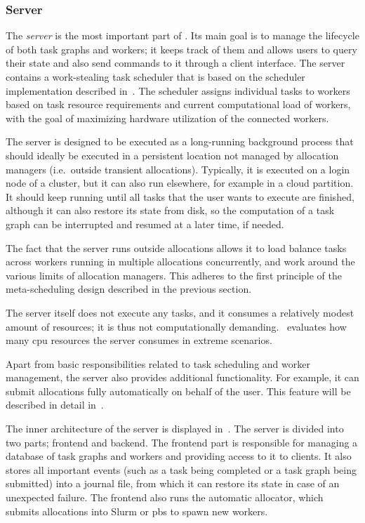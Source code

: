 \subsubsection*{Server}
The \emph{server} is the most important part of \hyperqueue{}. Its main goal is
to manage the lifecycle of both task graphs and workers; it keeps track of them and allows users to
query their state and also send commands to it through a client interface. The server contains a
work-stealing task scheduler that is based on the \rsds{} scheduler implementation
described in~. The scheduler assigns individual tasks to workers based on
task resource requirements and current computational load of workers, with the goal of maximizing
hardware utilization of the connected workers.

The server is designed to be executed as a long-running background process that should ideally be
executed in a persistent location not managed by allocation managers (i.e.\ outside transient
allocations). Typically, it is executed on a login node of a cluster, but it can also run
elsewhere, for example in a cloud partition. It should keep running until all tasks that the user
wants to execute are finished, although it can also restore its state from disk, so the computation
of a task graph can be interrupted and resumed at a later time, if needed.

The fact that the server runs outside allocations allows it to load balance tasks across workers
running in multiple allocations concurrently, and work around the various limits of allocation
managers. This adheres to the first principle of the meta-scheduling design described in the
previous section.

The server itself does not execute any tasks, and it consumes a relatively modest amount of
resources; it is thus not computationally demanding.~ evaluates how many
\gls{cpu} resources the server consumes in extreme scenarios.

Apart from basic responsibilities related to task scheduling and worker management, the server also
provides additional functionality. For example, it can submit allocations fully automatically on
behalf of the user. This feature will be described in detail in~.

The inner architecture of the server is displayed in~. The server is divided
into two parts; frontend and backend. The frontend part is responsible for managing a database of
task graphs and workers and providing access to it to clients. It also stores all important events
(such as a task being completed or a task graph being submitted) into a journal file, from which it
can restore its state in case of an unexpected failure. The frontend also runs the automatic
allocator, which submits allocations into Slurm or \gls{pbs} to spawn new workers.

